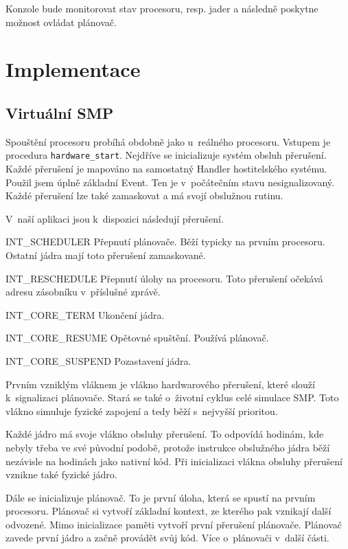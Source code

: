 \documentclass[a4paper,12pt]{article}
\begin{document}
Konzole bude monitorovat stav procesoru, resp. jader a následně poskytne možnost ovládat plánovač.

\section{Implementace}

\subsection{Virtuální SMP}
Spouštění procesoru probíhá obdobně jako u~reálného procesoru. Vstupem je procedura
\verb+hardware_start+. Nejdříve se inicializuje
systém obsluh přerušení. Každé přerušení je mapováno na samostatný Handler
hostitelského systému. Použil jsem úplně základní Event. Ten je v~počátečním stavu
nesignalizovaný. Každé přerušení lze také zamaskovat a má svojí obslužnou rutinu.

V~naší aplikaci jsou k~dispozici následují přerušení.

\begin{description}
\item{INT\_SCHEDULER} Přepnutí plánovače. Běží typicky na prvním procesoru. Ostatní
jádra mají toto přerušení zamaskované.
\item{INT\_RESCHEDULE} Přepnutí úlohy na procesoru. Toto přerušení očekává adresu
zásobníku v~příslušné zprávě.
\item{INT\_CORE\_TERM} Ukončení jádra.
\item{INT\_CORE\_RESUME} Opětovné spuštění. Používá plánovač.
\item{INT\_CORE\_SUSPEND} Pozastavení jádra.
\end{description}

Prvním vzniklým vláknem je vlákno hardwarového přerušení, které slouží k~signalizaci
plánovače. Stará se také o~životní cyklus celé simulace SMP. Toto vlákno simuluje
fyzické zapojení a tedy běží s~nejvyšší prioritou.

Každé jádro má svoje vlákno obsluhy přerušení. To odpovídá hodinám, kde nebyly třeba
ve své původní podobě, protože instrukce obslužného jádra běží nezávisle na hodinách
jako nativní kód. Při inicializaci vlákna obsluhy přerušení vznikne také fyzické jádro.

Dále se inicializuje plánovač. To je první úloha, která se spustí na prvním procesoru.
Plánovač si vytvoří základní kontext, ze kterého pak vznikají další odvozené. Mimo inicializace
paměti vytvoří první přerušení plánovače. Plánovač zavede první jádro a začně provádět
svůj kód. Více o~plánovači v~další části.
\end{document}
